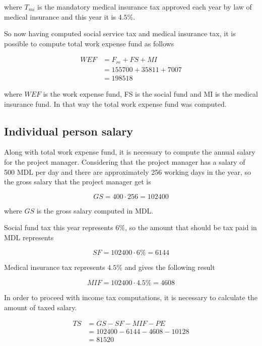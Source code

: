 \noindent
where $T_{mi}$ is the mandatory medical insurance tax approved each year by law of medical insurance and this year it is $4.5\%$. 

So now having computed social service tax and medical insurance tax, it is possible to compute total work expense fund as follows

\begin{equation}
\begin{split}
 WEF &= F_{re} + FS + MI\\
     &= 155700 + 35811 + 7007\\
     &= 198518
\end{split}
\end{equation}

\noindent
where $WEF$ is the work expense fund, FS is the social fund and MI is the medical insurance fund. In that way the total work expense fund was computed.


\subsection{Individual person salary}
Along with total work expense fund, it is necessary to compute the annual salary for the project manager. Considering that the project manager has a salary of 500 MDL per day and there are approximately 256 working days in the year, so the gross salary that the project manager get is

\begin{equation}
 GS = 400 \cdot 256 = 102400
\end{equation}

\noindent where $GS$ is the gross salary computed in MDL.

Social fund tax this year represents $6\%$, so the amount that should be tax paid in MDL represents

\begin{equation}
 SF = 102400 \cdot 6\% = 6144
\end{equation}

Medical insurance tax represents $4.5\%$ and gives the following result

\begin{equation}
 MIF = 102400 \cdot 4.5\% = 4608
\end{equation}

In order to proceed with income tax computations, it is necessary to calculate the amount of taxed salary.

\begin{equation}
\begin{split}
 TS &= GS - SF - MIF - PE \\
              &= 102400 - 6144 - 4608 - 10128\\ 
              &= 81520
\end{split}
\end{equation}

